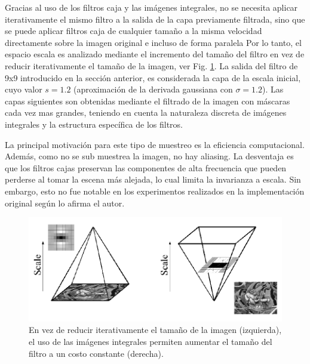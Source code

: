 Gracias al uso de los filtros caja y las imágenes integrales, no se necesita aplicar iterativamente el mismo filtro a la salida de la capa previamente filtrada, sino que se puede aplicar filtros caja de cualquier tamaño a la misma velocidad directamente sobre la imagen original e incluso de forma paralela %
Por lo tanto, el espacio escala es analizado mediante el incremento del tamaño del filtro en vez de reducir iterativamente el tamaño de la imagen, ver Fig. \ref{fig:pyramidfilters}. La salida del filtro de 9x9 introducido en la sección anterior, es considerada la capa de la escala inicial, cuyo valor $s=1.2$ (aproximación de la derivada gaussiana con $\sigma=1.2$). Las capas siguientes son obtenidas mediante el filtrado de la imagen con máscaras cada vez mas grandes, teniendo en cuenta la naturaleza discreta de imágenes integrales y la estructura específica de los filtros.

La principal motivación para este tipo de muestreo es la eficiencia computacional. Además, como no se sub muestrea la imagen, no hay aliasing. La desventaja es que los filtros cajas preservan las componentes de alta frecuencia que pueden perderse al tomar la escena más alejada, lo cual limita la invarianza a escala. Sin embargo, esto no fue notable en los experimentos realizados en la implementación original según lo afirma el autor.

\begin{figure}[tbhp]
   \centering
        \includegraphics[scale=0.4]{./figs/pyramidfilters}
    \caption[Pirámide de imágenes]{En vez de reducir iterativamente el tamaño de la imagen (izquierda), el uso de las imágenes integrales permiten aumentar el tamaño del filtro a un costo constante (derecha).}
   \label{fig:pyramidfilters}          %
\end{figure}

